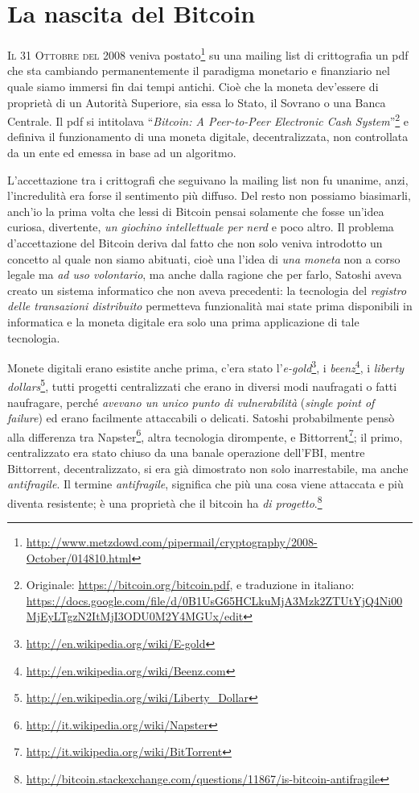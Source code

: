 \documentclass[a4paper,12pt,italian]{article}
\begin{document}
\section*{La nascita del Bitcoin}



\lettrine{I}{l 31 Ottobre del 2008} veniva
postato\footnote{\url{http://www.metzdowd.com/pipermail/cryptography/2008-October/014810.html}} 
su una mailing list di crittografia un pdf che sta cambiando permanentemente
 il paradigma monetario e finanziario nel quale siamo immersi fin
dai tempi antichi. Cioè che la moneta dev’essere di proprietà di un
Autorità Superiore, sia essa lo Stato, il Sovrano o una Banca Centrale.
Il pdf si intitolava “\emph{Bitcoin: A Peer-to-Peer Electronic Cash
System}”\footnote{Originale: \url{https://bitcoin.org/bitcoin.pdf}, e traduzione
in italiano: \url{https://docs.google.com/file/d/0B1UsG65HCLkuMjA3Mzk2ZTUtYjQ4Ni00MjEyLTgzN2ItMjI3ODU0M2Y4MGUx/edit}
} e definiva il funzionamento di una moneta digitale, decentralizzata, non controllata
da un ente ed emessa in base ad un algoritmo.

\smallskip

L’accettazione tra i crittografi che seguivano la mailing list non fu
unanime, anzi, l’incredulità era forse il sentimento più diffuso. Del
resto non possiamo biasimarli, anch’io la prima volta che lessi di
Bitcoin pensai solamente che fosse un’idea curiosa, divertente, \emph{un
giochino intellettuale per nerd} e poco altro. Il problema
d’accettazione del Bitcoin deriva dal fatto che non solo veniva
introdotto un concetto al quale non siamo abituati, cioè una l’idea di
\emph{una moneta} non a corso legale ma \emph{ad uso volontario}, ma anche dalla
ragione che per farlo, Satoshi aveva creato un sistema informatico che
non aveva precedenti: la tecnologia del \emph{registro delle transazioni
distribuito} permetteva funzionalità mai state prima disponibili in
informatica e la moneta digitale era solo una prima applicazione di
tale tecnologia.


\bigskip

Monete digitali erano esistite anche prima, c’era stato
l’\emph{e-gold}\footnote{\url{http://en.wikipedia.org/wiki/E-gold}}, i
\emph{beenz}\footnote{\url{http://en.wikipedia.org/wiki/Beenz.com}}, i \emph{liberty
dollars}\footnote{\url{http://en.wikipedia.org/wiki/Liberty\_Dollar}},
tutti progetti centralizzati che erano in diversi modi naufragati o
fatti naufragare, perché \emph{avevano un unico punto di vulnerabilità}
(\emph{single point of failure}) ed erano facilmente attaccabili o delicati.
Satoshi probabilmente pensò alla differenza tra Napster\footnote{\url{http://it.wikipedia.org/wiki/Napster}},
altra tecnologia dirompente, e Bittorrent\footnote{\url{http://it.wikipedia.org/wiki/BitTorrent}};
il primo, centralizzato era stato
chiuso da una banale operazione dell’FBI, mentre Bittorrent,
decentralizzato, si era già dimostrato non solo inarrestabile, ma anche
\emph{antifragile}. Il termine \emph{antifragile}, significa che più una cosa viene
attaccata e più diventa resistente; è una proprietà che il bitcoin ha \textit{di progetto}.\footnote{
\url{http://bitcoin.stackexchange.com/questions/11867/is-bitcoin-antifragile}}
\end{document}
